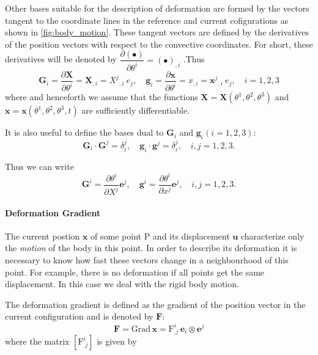 Other bases suitable for the description of deformation are formed by the vectors tangent to the coordinate lines in the reference and current cofigurations as shown in \cref{fig:body_motion}. These tangent vectors are defined by the derivatives of the position vectors with respect to the convective coordinates. For short, these derivatives will be denoted by
\(
    \dfrac{\partial \left( \bullet \right) }{\partial \theta^{i}}=\left( \bullet \right)_{,i}
\)
.Thus
\begin{equation}
\bm{G}_{i}=\dfrac{\partial \bm{X}}{\partial \theta ^{i}}=\bm{X}_{,i}={X^{j}}_{,i}\:{e_{j}}, \quad  
\bm{g}_{i}=\dfrac{\partial \bm{x}}{\partial \theta ^{i}}=x_{,i}={\bm{x}^{j}}_{,i}\:{e_{j}}, \quad 
i = 1,2,3
\end{equation}
where and henceforth we assume that the functions \(\bm{X} = \bm{X}(\theta^{1}, \theta^{2}, \theta^{3})\) and \(\bm{x} = \bm{x}(\theta^{1}, \theta^{2}, \theta^{3}, t)\) are sufficiently differentiable.

It is also useful to define the bases dual to \(\bm{G}_i\) and \(\bm{g}_i (i = 1,2,3)\):
\begin{equation}
    \bm{G}_{i} \cdot \bm{G}^{j} = \delta_{i}^{j}, \quad
    \bm{g}_{i} \cdot \bm{g}^{j} = \delta_{i}^{j}, \quad
    i,j = 1,2,3.
\end{equation}

Thus we can write
\begin{equation}
    \bm{G}^i = \dfrac{\partial \theta^{i}}{\partial X^{j}}\bm{e}^{j}, \quad
    \bm{g}^i = \dfrac{\partial \theta^{i}}{\partial x^{j}}\bm{e}^{j}, \quad
    i,j = 1,2,3.
\end{equation}

\paragraph*{Deformation Gradient}
The current postion \(\bm{x}\) of some point P and its displacement \(\bm{u}\) characterize only the \emph{motion} of the body in this point. In order to describe its deformation it is necessary to know how fast these vectors change in a neighbourhood of this point. For example, there is no deformation if all points get the same displacement. In this case we deal with the rigid body motion.

The deformation gradient is defined as the gradient of the position vector in the current configuration and is denoted by \(\mathbf{F}\):
\begin{equation}
    \mathbf{F} = \text{Grad}\,{\bm{x}} = 
    \text{F}^{i}_{.j}\,\bm{e}_{i} \otimes \bm{e}^{j}
\end{equation}
where the matrix \(\left[\text{F}^{i}_{.j}\right]\) is given by 

